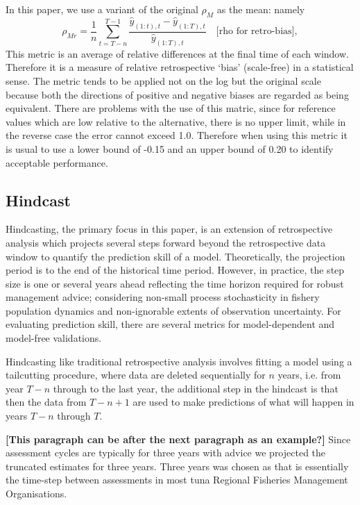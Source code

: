 \documentclass[12pt,halfline,a4paper,nonumbib]{ouparticle}
\newcommand{\disp}{\displaystyle}
\begin{document}
In this paper, we use a variant of the original $\rho_M$ as the mean: namely 
\begin{equation}
\label{eqn:mohn}
\rho_{Mr} = \disp \frac{1}{n} \sum_{t=T-n}^{T-1} \frac{\hat{y}_{(1:t),t}-\hat{y}_{(1:T),t}}{\hat{y}_{(1:T),t}} 
\quad \mbox{[rho for retro-bias]}, 
\end{equation}
This metric is an average of relative differences at the final time of each window. Therefore it is a measure of relative retrospective `bias' (scale-free) in a statistical sense. The metric tends to be applied not on the log but the original scale because both the directions of positive and negative biases are regarded as being equivalent.  There are problems with the use of this matric, since for reference values which are low relative to the alternative, there is no upper limit, while in the reverse case the error cannot exceed 1.0. Therefore when using this metric it is usual to use a lower bound of -0.15 and an upper bound of 0.20 to identify acceptable performance.

\subsection{Hindcast}

Hindcasting, the primary focus in this paper, is an extension of retrospective analysis which projects several steps forward beyond the retrospective data window to quantify the prediction skill of a model. Theoretically, the projection period is to the end of the historical time period. However, in practice, the step size is one or several years ahead reflecting the time horizon required for robust management advice; considering non-small process stochasticity in fishery population dynamics and non-ignorable extents of observation uncertainty. For evaluating prediction skill, there are several metrics for model-dependent and model-free validations. 

Hindcasting like traditional retrospective analysis involves fitting a model using a tailcutting procedure, where data are deleted sequentially for $n$ years, i.e. from year $T-n$ through to the last year, the additional step in the hindcast is that then the data from $T - n + 1$ are used to make predictions of what will happen in years $T - n$ through $T$.

\textbf{[This paragraph can be after the next paragraph as an example?]}
Since assessment cycles are typically for three years  with advice \parencite{fricker2013three} we projected the truncated estimates for three years. Three years was chosen as that is essentially the time-step between assessments in most tuna Regional Fisheries Management Organisations.
\end{document}
